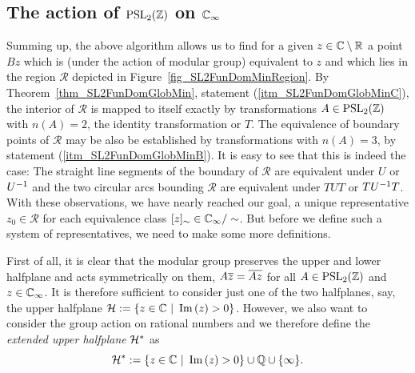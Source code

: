 \subsection{The action of $\operatorname{PSL}_{2}(\mathbb{Z})$ on $\mathbb{C}_{\infty}$}

Summing up, the above algorithm allows us to find for a given $z \in \mathbb{C} \setminus \mathbb{R}$ a point $Bz$ which is (under the action of modular group) equivalent to $z$  and which lies in the region $\mathcal{R}$ depicted in Figure~{\ref{fig_SL2FunDomMinRegion}}. By Theorem~\ref{thm_SL2FunDomGlobMin}, statement (\ref{itm_SL2FunDomGlobMinC}), the interior of $\mathcal{R}$ is mapped to itself exactly by transformations $A \in \operatorname{PSL}_{2}(\mathbb{Z})$ with $n(A) = 2$, \ie the identity transformation or $T$. The equivalence of boundary points of $\mathcal{R}$ may be also be established by transformations with $n(A) = 3$, by statement (\ref{itm_SL2FunDomGlobMinB}). It is easy to see that this is indeed the case: The straight line segments of the boundary of $\mathcal{R}$ are equivalent under $U$ or ${U}^{-1}$ and the two circular arcs bounding $\mathcal{R}$ are equivalent under $TUT$ or $T{U}^{-1}T$. With these observations, we have nearly reached our goal, a unique representative $z_0 \in \mathcal{R}$ for each equivalence class $[z]_\sim \in \mathbb{C}_{\infty}/\sim$. But before we define such a system of representatives, we need to make some more definitions.

First of all, it is clear that the modular group preserves the upper and lower halfplane and acts symmetrically on them, \ie $A\overline{z} = \overline{Az}$ for all $A \in \operatorname{PSL}_{2}(\mathbb{Z})$ and $z \in \mathbb{C}_{\infty}$. It is therefore sufficient to consider just one of the two halfplanes, say, the upper halfplane $\mathcal{H} := \{ z \in \mathbb{C} \ | \ \operatorname{Im}\left(z\right) > 0 \}$. However, we also want to consider the group action on rational numbers and we therefore define the \emph{extended upper halfplane} $\mathcal{H}^\ast$ as
\begin{equation}
\mathcal{H}^\ast := \{ z \in \mathbb{C} \ | \ \operatorname{Im}\left(z\right) > 0 \} \cup \mathbb{Q} \cup \{\infty\}.
\end{equation}

